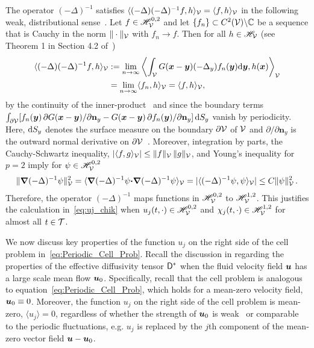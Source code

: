 \documentclass[amsa]{ipart}
\begin{document}
The operator $(-\Delta)^{-1}$ satisfies $\langle(-\Delta)(-\Delta)^{-1}f,h\rangle_{\mathcal{V}}=\langle
f,h\rangle_{\mathcal{V}}$ in the following weak, distributional
sense~\cite{McOwen:2003:PDE,Folland:95:PDEs,Stakgold:BVP:2000}.
Let $f\in\mathscr{H}^{0,2}_{\mathcal{V}}$ and let $\{f_n\}\subset C^2(\mathcal{V})\backslash\mathbb{C}$ be a sequence
that is Cauchy in the norm $\|\cdot\|_{\mathcal{V}}$ with $f_n\to f$. Then for all
$h\in\mathscr{H}_{\mathcal{V}}$ (see Theorem 1 in Section 4.2 of~\cite{McOwen:2003:PDE})       
%
\begin{align}\label{eq:Weak_Delta_1}
  \langle(-\Delta)(-\Delta)^{-1}f,h\rangle_{\Vc}
  &:=\lim_{n\to\infty}
  \left\langle\int_{\Vc} G(\vecx-\vecy)(-\Delta_y)f_n(\vecy)\d\vecy,h(\vecx)\right\rangle_{\Vc}
  \\\notag
  &=\lim_{n\to\infty}\langle f_n,h\rangle_{\Vc}
  =\langle f,h\rangle_{\Vc},
  \notag
\end{align}
%
by the continuity of the
inner-product~\cite{Folland:99:RealAnalysis,Stakgold:BVP:2000} 
and since the boundary terms~\cite{McOwen:2003:PDE}
$\int_{\partial\mathcal{V}}[f_n(\boldsymbol{y})\,\partial G(\boldsymbol{x}-\boldsymbol{y})/\partial\mathbf{n}_y
-G(\boldsymbol{x}-\boldsymbol{y})\,\partial f_n(\boldsymbol{y})/\partial\mathbf{n}_y]\,\mathrm{d} S_y$ vanish by   
periodicity. Here, $\mathrm{d} S_y$ denotes the surface measure on the
boundary $\partial\mathcal{V}$ of $\mathcal{V}$ and $\partial/\partial\mathbf{n}_y$ is the outward normal
derivative on $\partial\mathcal{V}$~\cite{McOwen:2003:PDE}. Moreover, integration by
parts, the Cauchy-Schwartz inequality, $|\langle
f,g\rangle_{\mathcal{V}}|\leq\|f\|_{\mathcal{V}}\,\|g\|_{\mathcal{V}}$, and Young's inequality for $p=2$
imply for $\psi\in\mathscr{H}^{0,2}_{\mathcal{V}}$   
%
\begin{align}\label{eq:L2_to_H1}
  \|\bnabla(-\Delta)^{-1}\psi\|^2_{\Vc}=\langle\bnabla(-\Delta)^{-1}\psi\bcdot\bnabla(-\Delta)^{-1}\psi\rangle_{\Vc}
              =|\langle(-\Delta)^{-1}\psi,\psi\rangle_{\Vc}|
              \leq C\|\psi\|_{\Vc}^2\,.
\end{align}
%
Therefore, the operator $(-\Delta)^{-1}$ maps  functions in
$\mathscr{H}^{0,2}_{\mathcal{V}}$ to $\mathscr{H}^{1,2}_{\mathcal{V}}$. This justifies the calculation
in~\eqref{eq:uj_chik} when $u_j(t,\cdot)\in\mathscr{H}^{0,2}_{\mathcal{V}}$ and
$\chi_j(t,\cdot)\in\mathscr{H}^{1,2}_{\mathcal{V}}$ for almost all $t\in\mathcal{T}$. 




We now discuss key properties of the function $u_j$ on the right
side of the cell problem in~\eqref{eq:Periodic_Cell_Prob}. Recall the 
discussion in  regarding the properties of the
effective diffusivity tensor $\mathsf{D}^*$ when the fluid velocity field
$\boldsymbol{u}$ has a large scale mean flow $\boldsymbol{u}_0$. Specifically, recall
that the cell problem is analogous to
equation~\eqref{eq:Periodic_Cell_Prob}, which holds for a mean-zero
velocity field, $\boldsymbol{u}_0\equiv0$. Moreover, the function $u_j$ on the right
side of the cell problem is mean-zero, $\langle u_j\rangle=0$, regardless of
whether the strength of $\boldsymbol{u}_0$ is
weak~\cite{Majda:Kramer:1999:book,Pavliotis:PHD_Thesis} or
comparable~\cite{Pavliotis:PHD_Thesis} to the periodic fluctuations,
e.g. $u_j$ is replaced by the $j$th component of the mean-zero vector
field $\boldsymbol{u}-\boldsymbol{u}_0$.  
\end{document}
